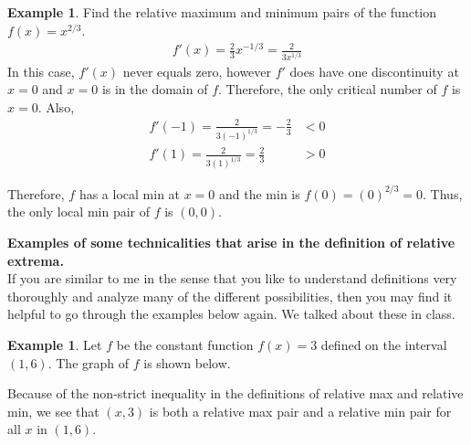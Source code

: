 \documentclass[reqno,psamsfonts]{amsart}
\theoremstyle{definition}
\newtheorem{exmp}[thm]{Example}
\theoremstyle{remark}
\numberwithin{equation}{section}
\begin{document}
\begin{exmp}
Find the relative maximum and minimum pairs of the function $f(x) = x^{2/3}$.
\begin{align*}
f'(x) = \frac{2}{3}x^{-1/3}=\frac{2}{3x^{1/3}}
\end{align*}
In this case, $f'(x)$ never equals zero, however $f'$ does have one discontinuity at $x=0$ and $x=0$ is in the domain of $f$. Therefore, the only critical number of $f$ is $x=0$. Also, 
\begin{align*}
f'(-1) = \frac{2}{3(-1)^{1/3}}=-\frac{2}{3}&<0\\
f'(1) = \frac{2}{3(1)^{1/3}}=\frac{2}{3}&>0
\end{align*}
\begin{center}
\end{center}
Therefore, $f$ has a local min at $x=0$ and the min is $f(0) = (0)^{2/3}=0$. Thus, the only local min pair of $f$ is $(0, 0)$. 
\end{exmp}
\vspace{2em}
\noindent\textbf{Examples of some technicalities that arise in the definition of relative extrema.}
\\If you are similar to me in the sense that you like to understand definitions very thoroughly and analyze many of the different possibilities, then you may find it helpful to go through the examples below again. We talked about these in class. 

\begin{exmp}
Let $f$ be the constant function $f(x) = 3$ defined on the interval $(1,6)$. The graph of $f$ is shown below. 
\begin{center}
\end{center}
\end{exmp}
Because of the non-strict inequality in the definitions of relative max and relative min, we see that $(x, 3)$ is both a relative max pair and a relative min pair for all $x$ in $(1,6)$. 
\end{document}
